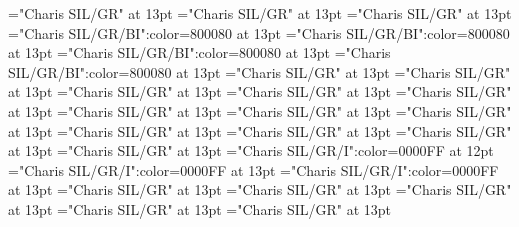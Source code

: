 \documentclass[a4paper]{article}
\begin{document}
\font\spanenpronunciationsentryletDatadicBody="Charis SIL/GR" at 13pt
\font\sensesentryletDatadicBody="Charis SIL/GR" at 13pt
\font\sensesensesentryletDatadicBody="Charis SIL/GR" at 13pt
\font\grammaticalinfosensesensesentryletDatadicBody="Charis SIL/GR/BI":color=800080 at 13pt
\font\partofspeechengrammaticalinfosensesensesentryletDatadicBody="Charis SIL/GR/BI":color=800080 at 13pt
\font\spanenpartofspeechengrammaticalinfosensesensesentryletDatadicBody="Charis SIL/GR/BI":color=800080 at 13pt
\font\spanengrammaticalinfosensesensesentryletDatadicBody="Charis SIL/GR/BI":color=800080 at 13pt
\font{}="Charis SIL/GR" at 13pt
\font\spanendefinitionensensesensesentryletDatadicBody="Charis SIL/GR" at 13pt
\font\LexSensepublishStemDefinitionPubensensesensesentryletDatadicBody="Charis SIL/GR" at 13pt
\font\spanenLexSensepublishStemDefinitionPubensensesensesentryletDatadicBody="Charis SIL/GR" at 13pt
\font\LexSensepublishStemGlossPubLcensensesensesentryletDatadicBody="Charis SIL/GR" at 13pt
\font\xitemenLexSensepublishStemGlossPubLcensensesensesentryletDatadicBody="Charis SIL/GR" at 13pt
\font\spanenxitemenLexSensepublishStemGlossPubLcensensesensesentryletDatadicBody="Charis SIL/GR" at 13pt
\font\xitemhiLexSensepublishStemGlossPubLcensensesensesentryletDatadicBody="Charis SIL/GR" at 13pt
\font\spanhixitemhiLexSensepublishStemGlossPubLcensensesensesentryletDatadicBody="Charis SIL/GR" at 13pt
\font\xitemteLexSensepublishStemGlossPubLcensensesensesentryletDatadicBody="Charis SIL/GR" at 13pt
\font\spantexitemteLexSensepublishStemGlossPubLcensensesensesentryletDatadicBody="Charis SIL/GR" at 13pt
\font\examplessensesensesentryletDatadicBody="Charis SIL/GR" at 13pt
\font\exampleggoTeluINexamplessensesensesentryletDatadicBody="Charis SIL/GR/I":color=0000FF at 12pt
\font\spanggoTeluINexampleggoTeluINexamplessensesensesentryletDatadicBody="Charis SIL/GR/I":color=0000FF at 13pt
\font\spanenexampleggoTeluINexamplessensesensesentryletDatadicBody="Charis SIL/GR/I":color=0000FF at 13pt
\font\translationsexamplessensesensesentryletDatadicBody="Charis SIL/GR" at 13pt
\font\CmTranslationpublishStemTypeConfigtranslationsexamplessensesensesentryletDatadicBody="Charis SIL/GR" at 13pt
\font\CmPossibilitypublishStemTransTypeAbbreviationPubenCmTranslationpublishStemTypeConfigtranslationsexamplessensesensesentryletDatadicBody="Charis SIL/GR" at 13pt
\font\spanenCmPossibilitypublishStemTransTypeAbbreviationPubenCmTranslationpublishStemTypeConfigtranslationsexamplessensesensesentryletDatadicBody="Charis SIL/GR" at 13pt
\font\CmPossibilitypublishStemTransTypeNamePubenCmTranslationpublishStemTypeConfigtranslationsexamplessensesensesentryletDatadicBody="Charis SIL/GR" at 13pt
\end{document}
